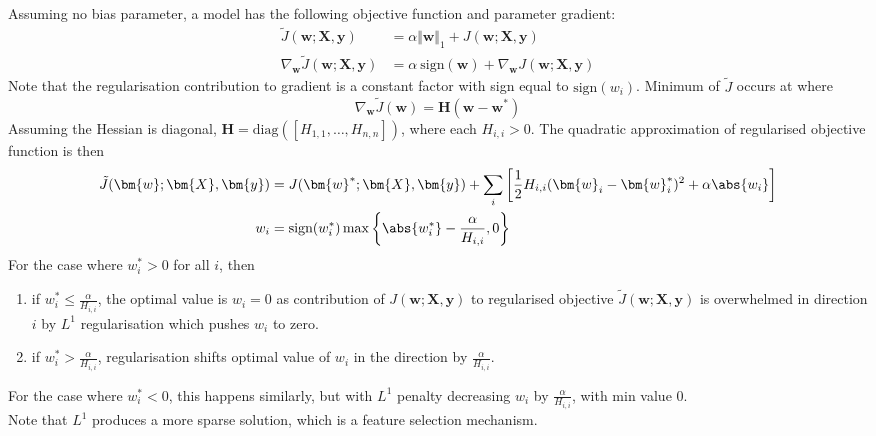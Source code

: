 \begin{definition} \\
Assuming no bias parameter, a model has the following objective function and parameter gradient:
\begin{align}
\tilde{J}(\bm{w}; \bm{X}, \bm{y}) &= \alpha \Vert \bm{w} \Vert_1 + J(\bm{w}; \bm{X}, \bm{y}) \nonumber \\
\nabla_{\bm{w}} \tilde{J}(\bm{w}; \bm{X}, \bm{y}) &= \alpha \ \text{sign}(\bm{w}) + \nabla_{\bm{w}} J(\bm{w}; \bm{X}, \bm{y}) \nonumber
\end{align}
Note that the regularisation contribution to gradient is a constant factor with sign equal to $\text{sign}(w_i)$. Minimum of $\tilde{J}$ occurs at where
\begin{equation*}
\nabla_{\bm{w}} \tilde{J}(\bm{w}) = \bm{H} (\bm{w} - \bm{w}^*) \nonumber
\end{equation*}
Assuming the Hessian is diagonal, $\bm{H} = \text{diag}([H_{1,1}, \ldots, H_{n,n}])$, where each $H_{i,i} > 0$. The quadratic approximation of regularised objective function is then
\begin{align}
\tilde{J}(\bm{w}; \bm{X}, \bm{y}) &= J(\bm{w}^*; \bm{X}, \bm{y}) + \sum_i \left[ \frac{1}{2} H_{i,i} (\bm{w}_i - \bm{w}_i^*)^2 + \alpha \abs{w_i} \right] \nonumber \\
w_i &= \text{sign}(w_i^*) \max \left\{ \abs{w_i^*} - \frac{\alpha}{H_{i,i}}, 0 \right\} \nonumber
\end{align}
For the case where $w_i^* > 0$ for all $i$, then
\begin{enumerate}[label=\roman*.]
\setlength{\itemsep}{0pt}
\item if $w_i^* \leq \frac{\alpha}{H_{i,i}}$, the optimal value is $w_i = 0$ as contribution of $J(\bm{w}; \bm{X}, \bm{y})$ to regularised objective $\tilde{J}(\bm{w}; \bm{X}, \bm{y})$ is overwhelmed in direction $i$ by $L^1$ regularisation which pushes $w_i$ to zero.
\item if $w_i^* > \frac{\alpha}{H_{i,i}}$, regularisation shifts optimal value of $w_i$ in the direction by $\frac{\alpha}{H_{i,i}}$.
\end{enumerate}
For the case where $w_i^* < 0$, this happens similarly, but with $L^1$ penalty decreasing $w_i$ by $\frac{\alpha}{H_{i,i}}$, with min value $0$.\\
Note that $L^1$ produces a more sparse solution, which is a feature selection mechanism.
\end{definition}

